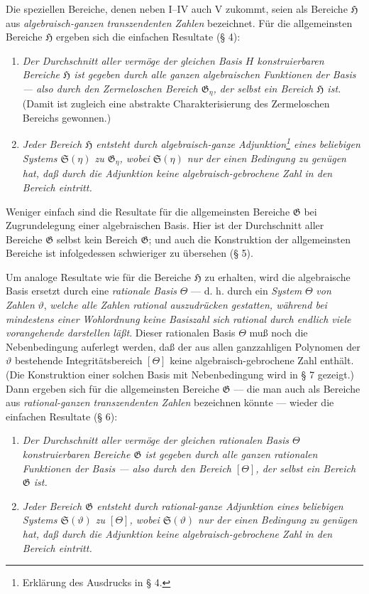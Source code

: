 \documentclass[11pt]{article}
\begin{document}
Die speziellen Bereiche, denen neben I--IV auch V zukommt, seien als Bereiche
$\mathfrak H$ aus \emph{algebraisch-ganzen transzendenten Zahlen} bezeichnet.
Für die allgemeinsten Bereiche $\mathfrak H$ ergeben sich die einfachen
Resultate (§ 4):
\begin{enumerate}
\item[a)] \emph{Der Durchschnitt aller vermöge der gleichen Basis $H$
konstruierbaren Bereiche $\mathfrak H$ ist gegeben durch alle ganzen
algebraischen Funktionen der Basis --- also durch den Zermeloschen Bereich
$\mathfrak G_\eta$, der selbst ein Bereich $\mathfrak H$ ist.} (Damit ist
zugleich eine abstrakte Charakterisierung des Zermeloschen Bereichs gewonnen.)
\item[b)] \emph{Jeder Bereich $\mathfrak H$ entsteht durch algebraisch-ganze
Adjunktion\footnote{Erklärung des Ausdrucks in § 4.} eines beliebigen Systems
$\mathfrak S(\eta)$ zu $\mathfrak G_\eta$, wobei $\mathfrak S(\eta)$ nur der
einen Bedingung zu genügen hat, daß durch die Adjunktion keine
algebraisch-gebrochene Zahl in den Bereich eintritt.}
\end{enumerate}

Weniger einfach sind die Resultate für die allgemeinsten Bereiche $\mathfrak G$
bei Zugrundelegung einer algebraischen Basis. Hier ist der Durchschnitt aller
Bereiche $\mathfrak G$ selbst kein Bereich $\mathfrak G$; und auch die
Konstruktion der allgemeinsten Bereiche ist infolgedessen schwieriger zu
übersehen (§ 5).

Um analoge Resultate wie für die Bereiche $\mathfrak H$ zu erhalten, wird die
algebraische Basis ersetzt durch eine \emph{rationale Basis} $\Theta$ --- d. h.
durch ein \emph{System} $\Theta$ \emph{von Zahlen} $\vartheta$, \emph{welche
alle Zahlen rational auszudrücken gestatten, während bei mindestens einer
Wohlordnung keine Basiszahl sich rational durch endlich viele vorangehende
darstellen läßt}. Dieser rationalen Basis $\Theta$ muß noch die Nebenbedingung
auferlegt werden, daß der aus allen ganzzahligen Polynomen der $\vartheta$
bestehende Integritätsbereich $[\Theta]$ keine algebraisch-gebrochene Zahl
enthält. (Die Konstruktion einer solchen Basis mit Nebenbedingung wird in § 7
gezeigt.) Dann ergeben sich für die allgemeinsten Bereiche $\mathfrak G$ ---
die man auch als Bereiche aus \emph{rational-ganzen transzendenten Zahlen}
bezeichnen könnte --- wieder die einfachen Resultate (§ 6):
\begin{enumerate}
\item[a)] \emph{Der Durchschnitt aller vermöge der gleichen rationalen Basis
$\Theta$ konstruierbaren Bereiche $\mathfrak G$ ist gegeben durch alle ganzen
rationalen Funktionen der Basis --- also durch den Bereich $[\Theta]$, der selbst
ein Bereich $\mathfrak G$ ist.}
\item[b)] \emph{Jeder Bereich $\mathfrak G$ entsteht durch rational-ganze
Adjunktion eines beliebigen Systems $\mathfrak S(\vartheta)$ zu $[\Theta]$,
wobei $\mathfrak S(\vartheta)$ nur der einen Bedingung zu genügen hat, daß durch
die Adjunktion keine algebraisch-gebrochene Zahl in den Bereich eintritt.}
\end{enumerate}
\end{document}
